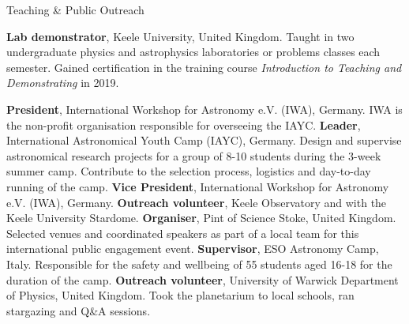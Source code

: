 \begin{rubric}{Teaching \& Public Outreach}

\entry*[2018 -- 2022]%
    \textbf{Lab demonstrator}, Keele University, United Kingdom. Taught in two undergraduate physics and astrophysics laboratories or problems classes each semester. Gained certification in the training course \emph{Introduction to Teaching and Demonstrating} in 2019.

    
\entry*[2023 -- ~~~~~\,\,\,~~~]%
    \textbf{President}, International Workshop for Astronomy e.V. (IWA), Germany. IWA is the non-profit organisation responsible for overseeing the IAYC.
\entry*[2017 -- ~~~~~\,\,\,~~~]%
    \textbf{Leader}, International Astronomical Youth Camp (IAYC), Germany. Design and supervise astronomical research projects for a group of 8-10 students during the 3-week summer camp. Contribute to the selection process, logistics and day-to-day running of the camp.
\entry*[2021 -- 2023]%
    \textbf{Vice President}, International Workshop for Astronomy e.V. (IWA), Germany.
\entry*[2019 -- 2022]%
    \textbf{Outreach volunteer}, Keele Observatory and with the Keele University Stardome. 
\entry*[2019 -- 2020]%
    \textbf{Organiser}, Pint of Science Stoke, United Kingdom. Selected venues and coordinated speakers as part of a local team for this international public engagement event.
\entry*[2017 -- 2019]%
    \textbf{Supervisor}, ESO Astronomy Camp, Italy. Responsible for the safety and wellbeing of 55 students aged 16-18 for the duration of the camp.%
\entry*[2017 -- 2018]%
    \textbf{Outreach volunteer}, University of Warwick Department of Physics, United Kingdom. Took the planetarium to local schools, ran stargazing and Q\&A sessions.

    
\end{rubric}
